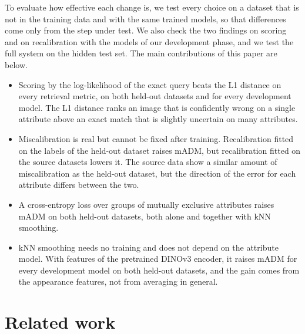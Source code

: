 \documentclass[10pt,twocolumn,letterpaper]{article}
\begin{document}
To evaluate how effective each change is, we test every choice on a dataset that is not in the training data and with the same trained models, so that differences come only from the step under test. We also check the two findings on scoring and on recalibration with the models of our development phase, and we test the full system on the hidden test set. The main contributions of this paper are below.
\begin{itemize}
\item Scoring by the log-likelihood of the exact query beats the L1 distance on every retrieval metric, on both held-out datasets and for every development model. The L1 distance ranks an image that is confidently wrong on a single attribute above an exact match that is slightly uncertain on many attributes.
\item Miscalibration is real but cannot be fixed after training. Recalibration fitted on the labels of the held-out dataset raises mADM, but recalibration fitted on the source datasets lowers it. The source data show a similar amount of miscalibration as the held-out dataset, but the direction of the error for each attribute differs between the two.
\item A cross-entropy loss over groups of mutually exclusive attributes raises mADM on both held-out datasets, both alone and together with kNN smoothing.
\item kNN smoothing needs no training and does not depend on the attribute model. With features of the pretrained DINOv3 encoder, it raises mADM for every development model on both held-out datasets, and the gain comes from the appearance features, not from averaging in general.
\end{itemize}

\section{Related work}
\label{sec:related}
\end{document}
